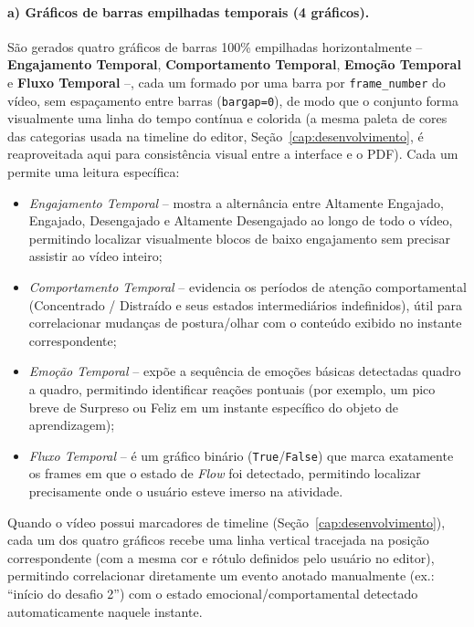 \documentclass[
	12pt,
	openright,
	oneside,
	a4paper,
	english,
	brazil
	]{abntex2}
\begin{document}
\paragraph{a) Gráficos de barras empilhadas temporais (4 gráficos).}
São gerados quatro gráficos de barras 100\% empilhadas horizontalmente -- \textbf{Engajamento Temporal}, \textbf{Comportamento Temporal}, \textbf{Emoção Temporal} e \textbf{Fluxo Temporal} --, cada um formado por uma barra por \texttt{frame\_number} do vídeo, sem espaçamento entre barras (\texttt{bargap=0}), de modo que o conjunto forma visualmente uma linha do tempo contínua e colorida (a mesma paleta de cores das categorias usada na timeline do editor, Seção~\ref{cap:desenvolvimento}, é reaproveitada aqui para consistência visual entre a interface e o PDF). Cada um permite uma leitura específica:
\begin{itemize}
    \item \textit{Engajamento Temporal} -- mostra a alternância entre Altamente Engajado, Engajado, Desengajado e Altamente Desengajado ao longo de todo o vídeo, permitindo localizar visualmente blocos de baixo engajamento sem precisar assistir ao vídeo inteiro;
    \item \textit{Comportamento Temporal} -- evidencia os períodos de atenção comportamental (Concentrado / Distraído e seus estados intermediários indefinidos), útil para correlacionar mudanças de postura/olhar com o conteúdo exibido no instante correspondente;
    \item \textit{Emoção Temporal} -- expõe a sequência de emoções básicas detectadas quadro a quadro, permitindo identificar reações pontuais (por exemplo, um pico breve de Surpreso ou Feliz em um instante específico do objeto de aprendizagem);
    \item \textit{Fluxo Temporal} -- é um gráfico binário (\texttt{True}/\texttt{False}) que marca exatamente os frames em que o estado de \textit{Flow} \cite{csikszentmihalyi1990flow} foi detectado, permitindo localizar precisamente onde o usuário esteve imerso na atividade.
\end{itemize}
Quando o vídeo possui marcadores de timeline (Seção~\ref{cap:desenvolvimento}), cada um dos quatro gráficos recebe uma linha vertical tracejada na posição correspondente (com a mesma cor e rótulo definidos pelo usuário no editor), permitindo correlacionar diretamente um evento anotado manualmente (ex.: ``início do desafio 2'') com o estado emocional/comportamental detectado automaticamente naquele instante.
\end{document}

